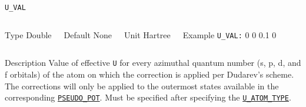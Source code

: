 \begin{frame}[allowframebreaks]{\texttt{U\_VAL}} \label{U_VAL}
\vspace*{-12pt}
\begin{columns}
\begin{block}{Type}
Double
\end{block}

\begin{block}{Default}
None
\end{block}

\begin{block}{Unit}
Hartree
\end{block}

\begin{block}{Example}
\texttt{U\_VAL:} 0 0 0.1 0 \\
\end{block}
\end{columns}

\begin{block}{Description}
Value of effective \texttt{U} for every azimuthal quantum number (s, p, d, and f orbitals) of the atom on which the correction is applied per Dudarev's scheme. The corrections will only be applied to the outermost states available in the corresponding \hyperlink{PSEUDO_POT}{\texttt{PSEUDO\_POT}}. Must be specified after specifying the \hyperlink{U_ATOM_TYPE}{\texttt{U\_ATOM\_TYPE}}.
\end{block}

\end{frame}
